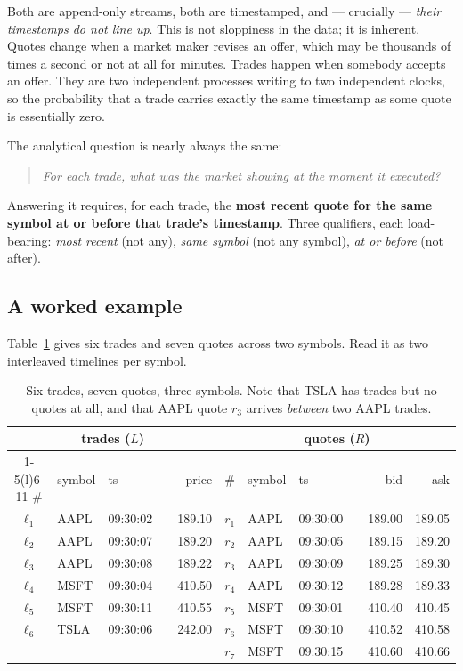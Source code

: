 \documentclass[11pt,a4paper]{report}
\theoremstyle{definition}
\theoremstyle{plain}
\begin{document}
Both are append-only streams, both are timestamped, and --- crucially --- \emph{their
timestamps do not line up}. This is not sloppiness in the data; it is inherent. Quotes
change when a market maker revises an offer, which may be thousands of times a second or
not at all for minutes. Trades happen when somebody accepts an offer. They are two
independent processes writing to two independent clocks, so the probability that a trade
carries exactly the same timestamp as some quote is essentially zero.

The analytical question is nearly always the same:

\begin{quote}
\emph{For each trade, what was the market showing at the moment it executed?}
\end{quote}

Answering it requires, for each trade, the \textbf{most recent quote for the same symbol at
or before that trade's timestamp}. Three qualifiers, each load-bearing: \emph{most recent}
(not any), \emph{same symbol} (not any symbol), \emph{at or before} (not after).

\subsection{A worked example}

Table~\ref{tab:worked} gives six trades and seven quotes across two symbols. Read it as two
interleaved timelines per symbol.

\begin{table}[h]
\centering
\small
\begin{tabular}{@{}clll r@{\qquad\qquad}clll rr@{}}
\toprule
\multicolumn{5}{c}{\textbf{trades} ($L$)} & \multicolumn{6}{c}{\textbf{quotes} ($R$)}\\
\cmidrule(r){1-5}\cmidrule(l){6-11}
\# & symbol & ts & & price & \# & symbol & ts & & bid & ask\\
\midrule
$\ell_1$ & AAPL & 09:30:02 & & 189.10 & $r_1$ & AAPL & 09:30:00 & & 189.00 & 189.05\\
$\ell_2$ & AAPL & 09:30:07 & & 189.20 & $r_2$ & AAPL & 09:30:05 & & 189.15 & 189.20\\
$\ell_3$ & AAPL & 09:30:08 & & 189.22 & $r_3$ & AAPL & 09:30:09 & & 189.25 & 189.30\\
$\ell_4$ & MSFT & 09:30:04 & & 410.50 & $r_4$ & AAPL & 09:30:12 & & 189.28 & 189.33\\
$\ell_5$ & MSFT & 09:30:11 & & 410.55 & $r_5$ & MSFT & 09:30:01 & & 410.40 & 410.45\\
$\ell_6$ & TSLA & 09:30:06 & & 242.00 & $r_6$ & MSFT & 09:30:10 & & 410.52 & 410.58\\
         &      &          & &        & $r_7$ & MSFT & 09:30:15 & & 410.60 & 410.66\\
\bottomrule
\end{tabular}
\caption{Six trades, seven quotes, three symbols. Note that TSLA has trades but no quotes
at all, and that AAPL quote $r_3$ arrives \emph{between} two AAPL trades.}
\label{tab:worked}
\end{table}
\end{document}
